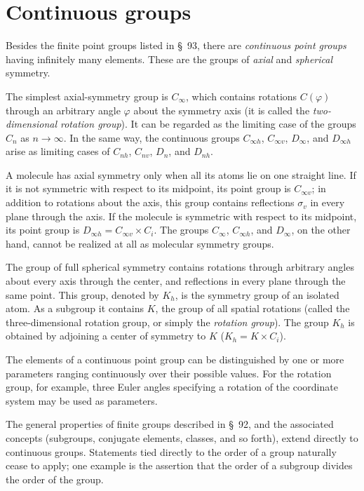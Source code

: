 \section{Continuous groups}

Besides the finite point groups listed in \S~93, there are \emph{continuous point groups} having infinitely many elements. These are the groups of \emph{axial} and \emph{spherical} symmetry.

The simplest axial-symmetry group is $C_\infty$, which contains rotations $C(\varphi)$ through an arbitrary angle $\varphi$ about the symmetry axis (it is called the \emph{two-dimensional rotation group}). It can be regarded as the limiting case of the groups $C_n$ as $n\to\infty$. In the same way, the continuous groups $C_{\infty h}$, $C_{\infty v}$, $D_\infty$, and $D_{\infty h}$ arise as limiting cases of $C_{nh}$, $C_{nv}$, $D_n$, and $D_{nh}$.

A molecule has axial symmetry only when all its atoms lie on one straight line. If it is not symmetric with respect to its midpoint, its point group is $C_{\infty v}$; in addition to rotations about the axis, this group contains reflections $\sigma_v$ in every plane through the axis. If the molecule is symmetric with respect to its midpoint, its point group is $D_{\infty h}=C_{\infty v}\times C_i$. The groups $C_\infty$, $C_{\infty h}$, and $D_\infty$, on the other hand, cannot be realized at all as molecular symmetry groups.

The group of full spherical symmetry contains rotations through arbitrary angles about every axis through the center, and reflections in every plane through the same point. This group, denoted by $K_h$, is the symmetry group of an isolated atom. As a subgroup it contains $K$, the group of all spatial rotations (called the three-dimensional rotation group, or simply the \emph{rotation group}). The group $K_h$ is obtained by adjoining a center of symmetry to $K$ ($K_h=K\times C_i$).

The elements of a continuous point group can be distinguished by one or more parameters ranging continuously over their possible values. For the rotation group, for example, three Euler angles specifying a rotation of the coordinate system may be used as parameters.

The general properties of finite groups described in \S~92, and the associated concepts (subgroups, conjugate elements, classes, and so forth), extend directly to continuous groups. Statements tied directly to the order of a group naturally cease to apply; one example is the assertion that the order of a subgroup divides the order of the group.

